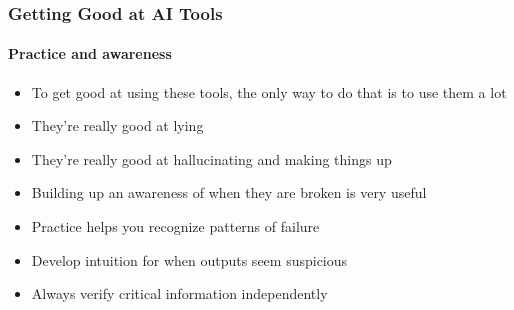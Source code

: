 \documentclass[aspectratio=169]{beamer}
\begin{document}
\begin{frame}
    \frametitle{Getting Good at AI Tools}
    \framesubtitle{Practice and awareness}
    
    \begin{itemize}
        \item To get good at using these tools, the only way to do that is to use them a lot
        \item They're really good at lying
        \item They're really good at hallucinating and making things up
        \item Building up an awareness of when they are broken is very useful
        \item Practice helps you recognize patterns of failure
        \item Develop intuition for when outputs seem suspicious
        \item Always verify critical information independently
    \end{itemize}
\end{frame}
\end{document}
